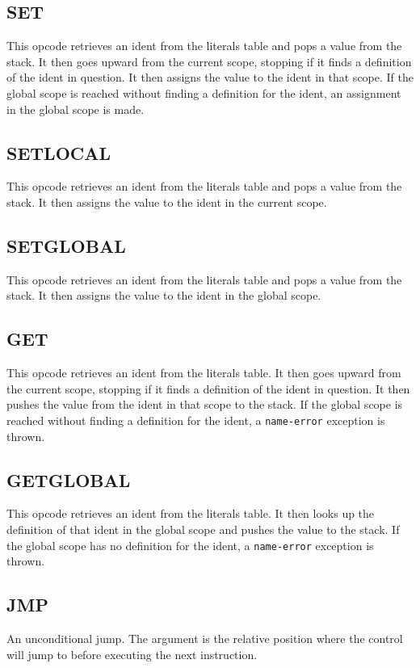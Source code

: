 \subsection{SET}
\label{sec:set}
This opcode retrieves an ident from the literals table and pops a
value from the stack. It then goes upward from the current scope,
stopping if it finds a definition of the ident in question. It then
assigns the value to the ident in that scope. If the global scope is
reached without finding a definition for the ident, an assignment in the
global scope is made.

\subsection{SET\textunderscore{}LOCAL}
\label{sec:set-local}
This opcode retrieves an ident from the literals table and pops a
value from the stack. It then assigns the value to the ident in the
current scope.

\subsection{SET\textunderscore{}GLOBAL}
\label{sec:set-global}
This opcode retrieves an ident from the literals table and pops a
value from the stack. It then assigns the value to the ident in the
global scope.

\subsection{GET}
\label{sec:get}
This opcode retrieves an ident from the literals table. It then goes
upward from the current scope, stopping if it finds a definition of the
ident in question. It then pushes the value from the ident in that scope
to the stack. If the global scope is reached without finding a
definition for the ident, a \verb!name-error! exception is thrown.

\subsection{GET\textunderscore{}GLOBAL}
\label{sec:get-global}
This opcode retrieves an ident from the literals table. It then looks up
the definition of that ident in the global scope and pushes the value to
the stack. If the global scope has no definition for the ident, a
\verb!name-error! exception is thrown.

\subsection{JMP}
\label{sec:jmp}
An unconditional jump. The argument is the relative position where the
control will jump to before executing the next instruction.


